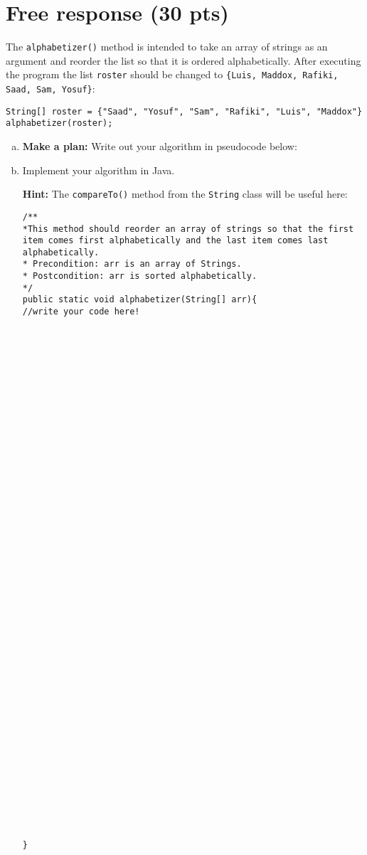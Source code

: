 \documentclass{exam}
\begin{document}
\newpage

\section*{Free response (30 pts)} 
The \texttt{alphabetizer()} method is intended to take an array of strings as an argument and reorder the list so that it is ordered alphabetically. After executing the program the list \texttt{roster} should be changed to \texttt{\{Luis, Maddox, Rafiki, Saad, Sam, Yosuf\}}:

\begin{lstlisting}
String[] roster = {"Saad", "Yosuf", "Sam", "Rafiki", "Luis", "Maddox"}
alphabetizer(roster);

\end{lstlisting}

\begin{enumerate}[a.]
\item \textbf{Make a plan:} Write out your algorithm in pseudocode below:

\makeemptybox{5in}

\newpage
\item
Implement your algorithm in Java. 

\textbf{Hint: }The \texttt{compareTo()} method from the \texttt{String} class will be useful here:

\begin{lstlisting}
/**
*This method should reorder an array of strings so that the first item comes first alphabetically and the last item comes last alphabetically.
* Precondition: arr is an array of Strings.
* Postcondition: arr is sorted alphabetically.
*/
public static void alphabetizer(String[] arr){
//write your code here!












































}
\end{lstlisting}

\end{enumerate}
\end{document}
